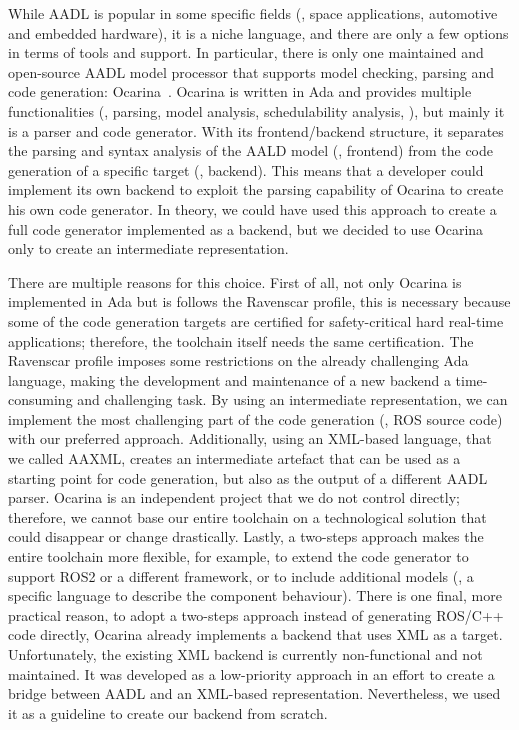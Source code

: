 While AADL is popular in some specific fields (\eg, space applications, automotive and embedded hardware), it is a niche language, and there are only a few options in terms of tools and support. In particular, there is only one maintained and open-source AADL model processor that supports model checking, parsing and code generation: Ocarina~\cite{hugues2008prototype}. Ocarina is written in Ada and provides multiple functionalities (\eg, parsing, model analysis, schedulability analysis, \etc), but mainly it is a parser and code generator. With its frontend/backend structure, it separates the parsing and syntax analysis of the AALD model (\ie, frontend) from the code generation of a specific target (\ie, backend). This means that a developer could implement its own backend to exploit the parsing capability of Ocarina to create his own code generator. In theory, we could have used this approach to create a full code generator implemented as a backend, but we decided to use Ocarina only to create an intermediate representation.

There are multiple reasons for this choice. First of all, not only Ocarina is implemented in Ada but is follows the Ravenscar profile, this is necessary because some of the code generation targets are certified for safety-critical hard real-time applications; therefore, the toolchain itself needs the same certification. The Ravenscar profile imposes some restrictions on the already challenging Ada language, making the development and maintenance of a new backend a time-consuming and challenging task. By using an intermediate representation, we can implement the most challenging part of the code generation (\ie, ROS source code) with our preferred approach. Additionally, using an XML-based language, that we called AAXML, creates an intermediate artefact that can be used as a starting point for code generation, but also as the output of a different AADL parser. Ocarina is an independent project that we do not control directly; therefore, we cannot base our entire toolchain on a technological solution that could disappear or change drastically. Lastly, a two-steps approach makes the entire toolchain more flexible, for example, to extend the code generator to support ROS2 or a different framework, or to include additional models (\eg, a specific language to describe the component behaviour). There is one final, more practical reason, to adopt a two-steps approach instead of generating ROS/C++ code directly, Ocarina already implements a backend that uses XML as a target. Unfortunately, the existing XML backend is currently non-functional and not maintained. It was developed as a low-priority approach in an effort to create a bridge between AADL and an XML-based representation. Nevertheless, we used it as a guideline to create our backend from scratch.

